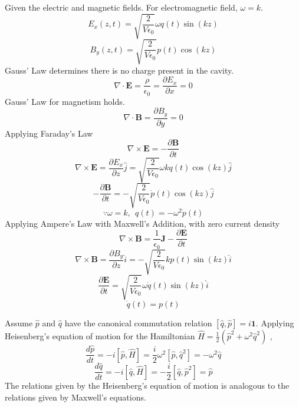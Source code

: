\begin{sol}
Given the electric and magnetic fields. For electromagnetic field, $\omega=k$.
\begin{equation}
	E_x(z,t)=\sqrt{\frac{2}{V\epsilon_0}}\omega q(t)\sin(kz)
\end{equation}
\begin{equation}
	B_y(z,t)=\sqrt{\frac{2}{V\epsilon_0}}p(t)\cos(kz)
\end{equation} 
Gauss' Law determines there is no charge present in the cavity.
\begin{equation}
	\nabla\cdot\mathbf{E}=\frac{\rho}{\epsilon_0}=\frac{\partial E_x}{\partial x}=0
\end{equation} 
Gauss' Law for magnetism holds.
\begin{equation}
	\nabla\cdot \mathbf{B}=\frac{\partial B_y}{\partial y}=0
\end{equation}
Applying Faraday's Law 
\begin{equation}
	\nabla\times\mathbf{E}=-\frac{\partial\mathbf{B}}{\partial t}
\end{equation}
\begin{equation}
	\nabla\times\mathbf{E}=\frac{\partial E_x}{\partial z}\hat j=\sqrt{\frac{2}{V\epsilon_0}}\omega k q(t)\cos(kz)\hat j
\end{equation}
\begin{equation}
	-\frac{\partial\mathbf B}{\partial t}=-\sqrt{\frac{2}{V\epsilon_0}}\dot p(t)\cos(kz)\hat j
\end{equation}
\begin{equation}
	\because\omega=k,\:\: q(t)=-\omega^2\dot p(t)
\end{equation} 
Applying Ampere's Law with Maxwell's Addition, with zero current density
\begin{equation}
	\nabla\times\mathbf B=\frac{1}{\epsilon_0}\mathbf J-\frac{\partial\mathbf{E}}{\partial t}
\end{equation}
\begin{equation}
	\nabla\times \mathbf B=\frac{\partial B_y}{\partial z}\hat i=-\sqrt{\frac{2}{V\epsilon_0}}kp(t)\sin(kz)\hat i
\end{equation} \begin{equation}
	\frac{\partial\mathbf{E}}{\partial t}=\sqrt{\frac{2}{V\epsilon_0}}\omega \dot q(t)\sin(kz)\hat i
\end{equation} 
\begin{equation}
	\dot q(t)=p(t)
\end{equation}

Assume $\hat p$ and $\hat q$ have the canonical commutation relation $[\hat q,\hat p]=i\mathbf 1$. Applying Heisenberg's equation of motion for the Hamiltonian $\hat H=\frac{1}{2}(\hat p^2+\omega^2\hat q^2)$ , 
\begin{equation}
	\frac{d\hat p}{dt}=-i[\hat p,\hat H]=\frac{i}{2}\omega^2[\hat p,\hat q^2]=-\omega^2\hat q
\end{equation}  
\begin{equation}
	\frac{d\hat q}{dt}=-i[\hat q,\hat H]=-\frac{i}{2}[\hat q,\hat p^2]=\hat p
\end{equation}
The relations given by the Heisenberg's equation of motion is analogous to the relations given by Maxwell's equations. 
\end{sol}